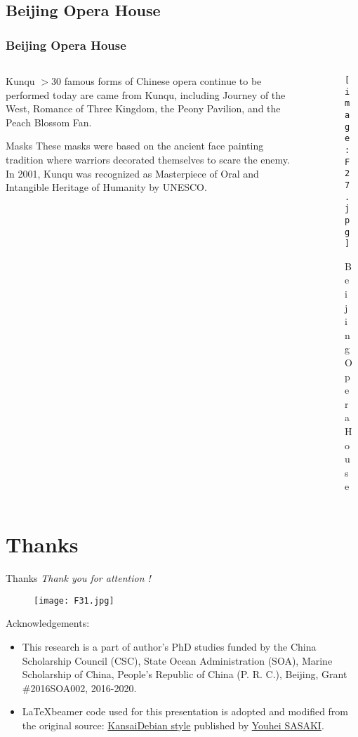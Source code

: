\documentclass[pdflatex,compress,8pt,
	xcolor={dvipsnames,dvipsnames,svgnames,x11names,table},
	hyperref={	
	breaklinks = true, 
	pdfauthor={Lemenkova Polina}, 
	pdfsubject={Preentation}, 
	pdfcreator={Lemenkova Polina}, 
	pdfproducer={Lemenkova Polina}, 
	colorlinks=true,
	linkcolor=NavyBlue, 
	citecolor=NavyBlue, 
	urlcolor = NavyBlue, 
	breaklinks = true}]{beamer}
\begin{document}
\subsection{Beijing Opera House}
\begin{frame}\frametitle{Beijing Opera House}
	\begin{minipage}[0.4\textheight]{\textwidth}
		\begin{columns}[T]
			\begin{column}{0.4\textwidth}
			
	\begin{alertblock}{Kunqu}
	$>30$ famous forms of Chinese opera continue to be performed today are came from Kunqu, including Journey of the West, Romance of Three Kingdom, the Peony Pavilion, and the Peach Blossom Fan.
	\end{alertblock}
	
	\begin{block}{Masks}	
These masks were based on the ancient face painting tradition where warriors decorated themselves to scare the enemy.
In 2001, Kunqu was recognized as Masterpiece of Oral and Intangible Heritage of Humanity by UNESCO.
	\end{block}
	
			\end{column}
			\begin{column}{0.6\textwidth}
			\vspace{3em}
				\begin{figure}[H]
					\centering
						\texttt{[image: F27.jpg]}\caption{Beijing Opera House}
				\end{figure}
				
			\end{column}
		\end{columns}
	\end{minipage}
\end{frame}

\section{Thanks}
\begin{frame}{Thanks}
	\centering\emph{Thank you for attention !}\\
	\begin{figure}[H]
		\centering
			\texttt{[image: F31.jpg]}
	\end{figure}
\normalsize{	
Acknowledgements:
\begin{itemize}
	\item This research is a part of author's PhD studies funded by the China Scholarship Council (CSC), State Ocean Administration (SOA), Marine Scholarship of China, People's Republic of China (P. R. C.), Beijing, Grant \#2016SOA002, 2016-2020.	
	\item \LaTeX \space beamer code used for this presentation is adopted and modified from the original source: \href{https://github.com/uwabami/beamerthemeKansaiDebianMeeting/blob/master/beamerthemeKansaiDebian.sty}{KansaiDebian style}  published by \href{https://github.com/uwabami}{Youhei SASAKI}.  
\end{itemize}
}	
\end{frame}
\end{document}
